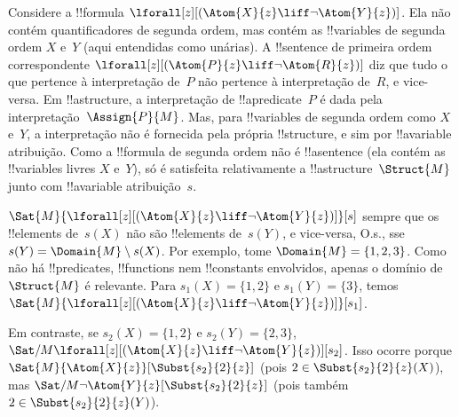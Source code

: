 \documentclass[../../../include/open-logic-section]{subfiles}
\begin{document}
\begin{ex}
  Considere a !!{formula} $\lforall[z][(\Atom{X}{z} \liff \lnot
    \Atom{Y}{z})]$. Ela não contém quantificadores de segunda ordem, mas
  contém as !!{variable}s de segunda ordem $X$ e~$Y$ (aqui entendidas como
  unárias). A !!{sentence} de primeira ordem correspondente
  $\lforall[z][(\Atom{P}{z} \liff \lnot \Atom{R}{z})]$ diz que tudo o que
  pertence à interpretação de~$P$ não pertence à interpretação de~$R$, e
  vice-versa. Em !!a{structure}, a interpretação de !!a{predicate}~$P$ é
  dada pela interpretação~$\Assign{P}{M}$. Mas, para !!{variable}s de
  segunda ordem como $X$ e~$Y$, a interpretação não é fornecida pela própria
  !!{structure}, e sim por !!a{variable} atribuição. Como a !!{formula} de
  segunda ordem não é !!a{sentence} (ela contém as !!{variable}s livres $X$
  e~$Y$), só é satisfeita relativamente a !!a{structure}~$\Struct{M}$ junto
  com !!a{variable} atribuição~$s$.

  $\Sat{M}{\lforall[z][(\Atom{X}{z} \liff \lnot \Atom{Y}{z})]}[s]$
  sempre que os !!{element}s de~$s(X)$ não são !!{element}s de~$s(Y)$, e
  vice-versa, O.s.\@, sse $s(Y) = \Domain{M} \setminus s(X)$. Por exemplo,
  tome $\Domain{M} = \{1, 2, 3\}$. Como não há !!{predicate}s,
  !!{function}s nem !!{constant}s envolvidos, apenas o domínio de
  ~$\Struct{M}$ é relevante. Para $s_1(X) = \{1, 2\}$ e
  $s_1(Y) = \{3\}$, temos $\Sat{M}{\lforall[z][(\Atom{X}{z}
      \liff \lnot \Atom{Y}{z})]}[s_1]$.

  Em contraste, se $s_2(X) = \{1, 2\}$ e $s_2(Y) = \{2, 3\}$,
  $\Sat/{M}{\lforall[z][(\Atom{X}{z} \liff \lnot
      \Atom{Y}{z})]}[s_2]$. Isso ocorre porque
  $\Sat{M}{\Atom{X}{z}}[\Subst{s_2}{2}{z}]$ (pois $2 \in \Subst{s_2}{2}{z}(X)$), mas
  $\Sat/{M}{\lnot \Atom{Y}{z}}[\Subst{s_2}{2}{z}]$ (pois também $2 \in
  \Subst{s_2}{2}{z}(Y)$).
\end{ex}
\end{document}
